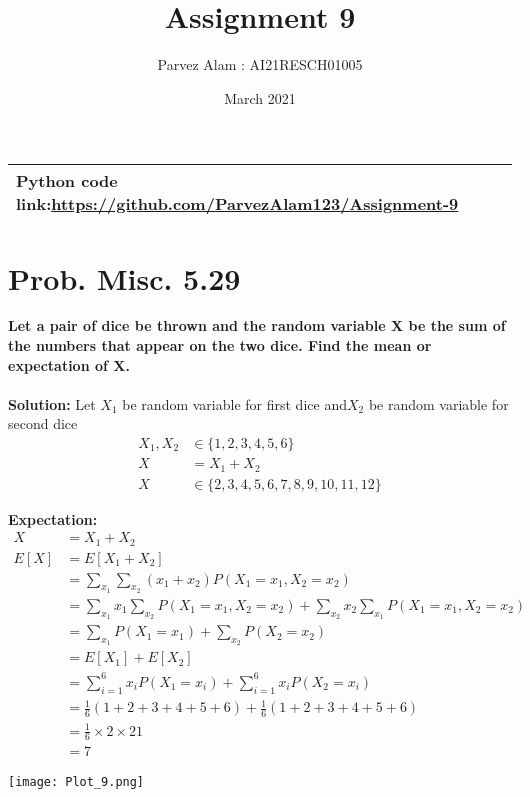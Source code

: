 \documentclass{article}
\title{Assignment 9}
\author{Parvez Alam : AI21RESCH01005 }
\date{March 2021}
\begin{document}
\maketitle
\begin{multicols}{2}
\begin{center}
    \begin{tabular}{|p{5cm}|}
    \hline
        Python code link:\url{https://github.com/ParvezAlam123/Assignment-9} \\
        \hline
    \end{tabular}
\end{center}


\section{Prob. Misc. 5.29}
\textbf{Let a pair of dice be thrown and the random variable X be the sum of the numbers that appear on the two dice. Find the mean or expectation of X.} \\ \\
\textbf{Solution:} 
Let \(X_1\) be random variable for first dice and\( X_2\) be random variable for second dice
\begin{align}
    X_1, X_2 &\in \{1,2,3,4,5,6\}  \nonumber \\
    X &= X_1+X_2 \nonumber  \nonumber \\
    X &\in \{2,3,4,5,6,7,8,9,10,11,12\} \nonumber 
\end{align}

\textbf{Expectation:} \\
\begin{align}
    X &=X_1+X_2 \nonumber \\
    E[X] &=E[X_1+X_2] \nonumber \\
         &=\sum _{x_1} \sum _{x_2}(x_1+x_2)P(X_1=x_1,X_2=x_2) \nonumber \\
         &=\sum_{x_1}x_1 \sum_{x_2} P(X_1=x_1, X_2=x_2)+\sum_{x_2}x_2 \sum_{x_1}P(X_1=x_1,X_2=x_2) \nonumber \\
         &=\sum_{x_1}P(X_1=x_1)+\sum_{x_2}P(X_2=x_2) \nonumber \\
         &=E[X_1]+E[X_2] \nonumber \\
         &=\sum _{i=1}^6x_iP(X_1=x_i)+\sum _{i=1}^6x_iP(X_2=x_i) \nonumber \\
         &=\frac{1}{6}(1+2+3+4+5+6)+\frac{1}{6}(1+2+3+4+5+6) \nonumber \\
         &=\frac{1}{6}\times 2 \times 21 \nonumber \\
         &=7 \nonumber
\end{align}

\texttt{[image: Plot\_9.png]}



\end{multicols}
\end{document}
